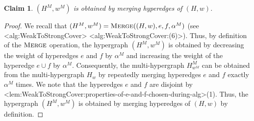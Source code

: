 \documentclass{article}
\def\Cref#1{<#1>}%
\newtheorem{claim}{Claim}[section]
\newcommand{\shubhang}[1]{{\color{blue}[{\tiny Shubhang: \bf #1}]\marginpar{\color{blue}*}}}
\newcommand{\knote}[1]{{\color{red}[{\tiny Karthik: \bf #1}]\marginpar{\color{red}*}}}
\newcommand{\merge}{\ensuremath{\textsc{Merge}}\xspace}
\begin{document}
    \begin{claim}\label{claim:WeakToStrong:MergeProperty:H^Mw^M-from-Hw}
        $(H^M,w^M)$ is obtained by merging hyperedges of $(H, w)$.
    \end{claim}
    \begin{proof}
        We recall that $(H^M, w^M) = \merge((H,w), e, f, \alpha^M)$ (see \Cref{alg:WeakToStrongCover} \Cref{alg:WeakToStrongCover:(6)}).
        Thus, by definition of the \merge operation, the hypergraph $(H^M, w^M)$ is obtained by decreasing the weight of hyperedges $e$ and $f$ by $\alpha^M$ and increasing the weight of the hyperedge $e\cup f$ by $\alpha^M$. Consequently, the multi-hypergraph $H^M_{w^M}$ can be obtained from the multi-hypergraph $H_w$ by repeatedly merging hyperedges $e$ and $f$ exactly $\alpha^M$ times. We note that the hyperedges $e$ and $f$ are disjoint by \Cref{lem:WeakToStrongCover:properties-of-e-and-f-chosen-during-alg}(1). Thus, the hypergraph $(H^M,w^M)$ is obtained by merging hyperedges of $(H, w)$ by definition. 
    \end{proof}

\end{document}
